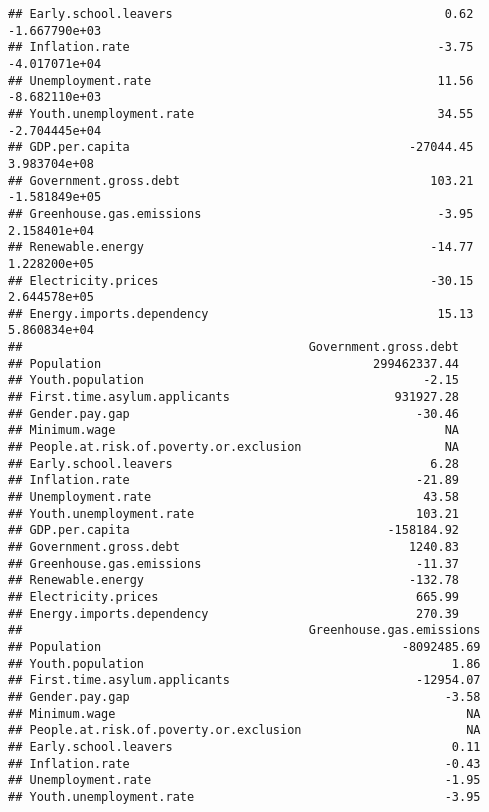 \documentclass[
]{article}
\begin{document}
\begin{verbatim}
## Early.school.leavers                                      0.62  -1.667790e+03
## Inflation.rate                                           -3.75  -4.017071e+04
## Unemployment.rate                                        11.56  -8.682110e+03
## Youth.unemployment.rate                                  34.55  -2.704445e+04
## GDP.per.capita                                       -27044.45   3.983704e+08
## Government.gross.debt                                   103.21  -1.581849e+05
## Greenhouse.gas.emissions                                 -3.95   2.158401e+04
## Renewable.energy                                        -14.77   1.228200e+05
## Electricity.prices                                      -30.15   2.644578e+05
## Energy.imports.dependency                                15.13   5.860834e+04
##                                        Government.gross.debt
## Population                                      299462337.44
## Youth.population                                       -2.15
## First.time.asylum.applicants                       931927.28
## Gender.pay.gap                                        -30.46
## Minimum.wage                                              NA
## People.at.risk.of.poverty.or.exclusion                    NA
## Early.school.leavers                                    6.28
## Inflation.rate                                        -21.89
## Unemployment.rate                                      43.58
## Youth.unemployment.rate                               103.21
## GDP.per.capita                                    -158184.92
## Government.gross.debt                                1240.83
## Greenhouse.gas.emissions                              -11.37
## Renewable.energy                                     -132.78
## Electricity.prices                                    665.99
## Energy.imports.dependency                             270.39
##                                        Greenhouse.gas.emissions
## Population                                          -8092485.69
## Youth.population                                           1.86
## First.time.asylum.applicants                          -12954.07
## Gender.pay.gap                                            -3.58
## Minimum.wage                                                 NA
## People.at.risk.of.poverty.or.exclusion                       NA
## Early.school.leavers                                       0.11
## Inflation.rate                                            -0.43
## Unemployment.rate                                         -1.95
## Youth.unemployment.rate                                   -3.95

\end{verbatim}
\end{document}

